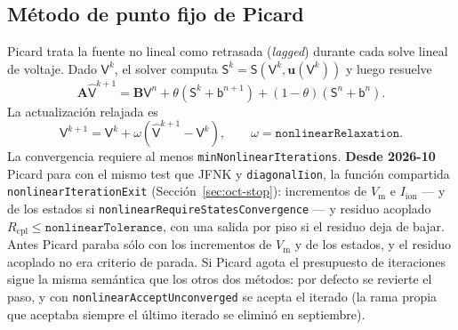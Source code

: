 \documentclass[11pt,a4paper]{article}
\newcommand{\code}[1]{\texttt{\small #1}}
\newcommand{\Vm}{V_{\text{m}}}
\newcommand{\Iion}{I_{\mathrm{ion}}}
\newcommand{\Aimp}{\mathbf{A}}
\newcommand{\Bimp}{\mathbf{B}}
\begin{document}
\subsection{Método de punto fijo de Picard}
\label{sec:picard}

Picard trata la fuente no lineal como retrasada (\emph{lagged}) durante cada solve lineal de
voltaje. Dado $\mathsf{V}^{k}$, el solver computa
$\mathsf{S}^{k}=\mathsf{S}(\mathsf{V}^{k},\mathbf{u}(\mathsf{V}^{k}))$ y luego resuelve
\begin{equation}
  \Aimp \widehat{\mathsf{V}}^{k+1}
  =
  \Bimp\mathsf{V}^{n}
  +\theta(\mathsf{S}^{k}+\mathsf{b}^{n+1})
  +(1-\theta)(\mathsf{S}^{n}+\mathsf{b}^{n}).
\end{equation}
La actualización relajada es
\begin{equation}
  \mathsf{V}^{k+1}
  =
  \mathsf{V}^{k}
  +
  \omega\left(\widehat{\mathsf{V}}^{k+1}-\mathsf{V}^{k}\right),
  \qquad
  \omega=\texttt{nonlinearRelaxation}.
\end{equation}
La convergencia requiere al menos \code{minNonlinearIterations}. \textbf{Desde 2026-10}
Picard para con el mismo test que JFNK y \code{diagonalIion}, la función compartida
\code{nonlinearIterationExit} (Sección~\ref{sec:oct-stop}): incrementos de $\Vm$ e $\Iion$
--- y de los estados si \code{nonlinearRequireStatesConvergence} --- y residuo acoplado
$R_{\mathrm{cpl}}\le\texttt{nonlinearTolerance}$, con una salida por piso si el residuo deja
de bajar. Antes Picard paraba sólo con los incrementos de $\Vm$ y de los estados, y el
residuo acoplado no era criterio de parada. Si Picard agota el presupuesto de iteraciones
sigue la misma semántica que los otros dos métodos: por defecto se revierte el paso, y con
\code{nonlinearAcceptUnconverged} se acepta el iterado (la rama propia que aceptaba
siempre el último iterado se eliminó en septiembre).
\end{document}
